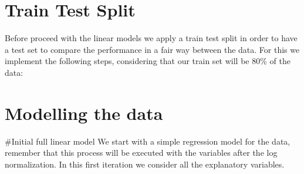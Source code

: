 \documentclass[
]{article}
\newenvironment{Shaded}{\begin{snugshade}}{\end{snugshade}}
\newcommand{\AttributeTok}[1]{\textcolor[rgb]{0.13,0.29,0.53}{#1}}
\newcommand{\CommentTok}[1]{\textcolor[rgb]{0.56,0.35,0.01}{\textit{#1}}}
\newcommand{\DecValTok}[1]{\textcolor[rgb]{0.00,0.00,0.81}{#1}}
\newcommand{\FloatTok}[1]{\textcolor[rgb]{0.00,0.00,0.81}{#1}}
\newcommand{\FunctionTok}[1]{\textcolor[rgb]{0.13,0.29,0.53}{\textbf{#1}}}
\newcommand{\NormalTok}[1]{#1}
\newcommand{\OtherTok}[1]{\textcolor[rgb]{0.56,0.35,0.01}{#1}}
\newcommand{\SpecialCharTok}[1]{\textcolor[rgb]{0.81,0.36,0.00}{\textbf{#1}}}
\begin{document}
\section{Train Test Split}\label{train-test-split}

Before proceed with the linear models we apply a train test split in
order to have a test set to compare the performance in a fair way
between the data. For this we implement the following steps, considering
that our train set will be 80\% of the data:

\begin{Shaded}
\end{Shaded}

\section{Modelling the data}\label{modelling-the-data}

\#Initial full linear model We start with a simple regression model for
the data, remember that this process will be executed with the variables
after the log normalization. In this first iteration we consider all the
explanatory variables.
\end{document}
